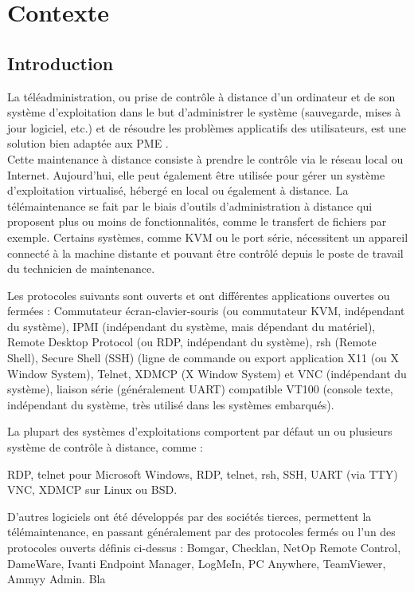 \chapter{Contexte}


\section{Introduction}


La téléadministration, ou prise de contrôle à distance d'un ordinateur et de son système d'exploitation dans le but d’administrer le système (sauvegarde, mises à jour logiciel, etc.) et de résoudre les problèmes applicatifs des utilisateurs, est une solution bien adaptée aux PME \cite{ref4}. \\

Cette maintenance à distance consiste à prendre le contrôle via le réseau local ou Internet. Aujourd'hui, elle peut également être utilisée pour gérer un système d'exploitation virtualisé, hébergé en local ou également à distance. La télémaintenance se fait par le biais d'outils d'administration à distance qui proposent plus ou moins de fonctionnalités, comme le transfert de fichiers par exemple. Certains systèmes, comme KVM ou le port série, nécessitent un appareil connecté à la machine distante et pouvant être contrôlé depuis le poste de travail du technicien de maintenance.

    Les protocoles suivants sont ouverts et ont différentes applications ouvertes ou fermées : Commutateur écran-clavier-souris (ou commutateur KVM, indépendant du système), IPMI (indépendant du système, mais dépendant du matériel), Remote Desktop Protocol (ou RDP, indépendant du système), rsh (Remote Shell), Secure Shell (SSH) (ligne de commande ou export application X11 (ou X Window System), Telnet, XDMCP (X Window System) et VNC (indépendant du système), liaison série (généralement UART) compatible VT100 (console texte, indépendant du système, très utilisé dans les systèmes embarqués).

La plupart des systèmes d'exploitations comportent par défaut un ou plusieurs système de contrôle à distance, comme :

    RDP, telnet pour Microsoft Windows,
    RDP, telnet, rsh, SSH, UART (via TTY) VNC, XDMCP sur Linux ou BSD.

D'autres logiciels ont été développés par des sociétés tierces, permettent la télémaintenance, en passant généralement par des protocoles fermés ou l'un des protocoles ouverts définis ci-dessus : Bomgar, Checklan, NetOp Remote Control, DameWare, Ivanti Endpoint Manager, LogMeIn, PC Anywhere, TeamViewer, Ammyy Admin. 
Bla\\

